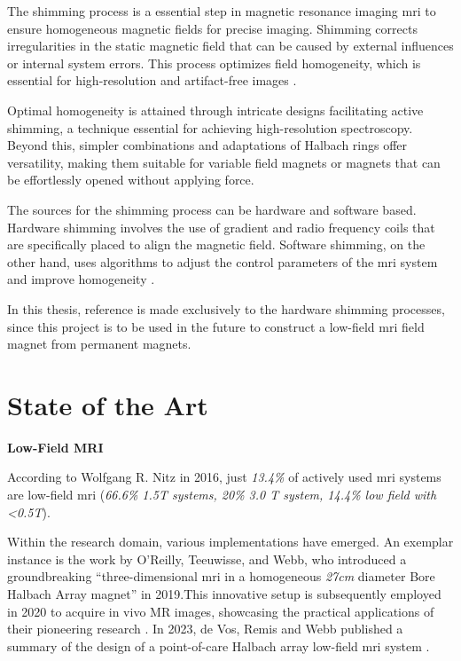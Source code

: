 The shimming process is a essential step in magnetic resonance imaging
\gls{mri} to ensure homogeneous magnetic fields for precise imaging.
Shimming corrects irregularities in the static magnetic field that can
be caused by external influences or internal system errors. This process
optimizes field homogeneity, which is essential for high-resolution and
artifact-free images \cite{10.3389/fphy.2021.704566}.

Optimal homogeneity is attained through intricate designs facilitating
active shimming, a technique essential for achieving high-resolution
spectroscopy. Beyond this, simpler combinations and adaptations of
Halbach rings offer versatility, making them suitable for variable field
magnets or magnets that can be effortlessly opened without applying
force. \cite{inbook}

The sources for the shimming process can be hardware and software based.
Hardware shimming involves the use of gradient and radio frequency coils
that are specifically placed to align the magnetic field. Software
shimming, on the other hand, uses algorithms to adjust the control
parameters of the \gls{mri} system and improve homogeneity
\cite{10.3389/fphy.2021.704566}.

In this thesis, reference is made exclusively to the hardware shimming
processes, since this project is to be used in the future to construct a
low-field \gls{mri} field magnet from permanent magnets.

\hypertarget{state-of-the-art}{%
\section{State of the Art}\label{state-of-the-art}}

\textbf{Low-Field MRI}

According to Wolfgang R. Nitz in 2016, just \emph{13.4\%} of actively
used \gls{mri} systems are low-field \gls{mri} (\emph{66.6\% 1.5T
systems, 20\% 3.0 T system, 14.4\% low field with \textless0.5T}).
\cite{Nitz2016}

Within the research domain, various implementations have emerged. An
exemplar instance is the work by O'Reilly, Teeuwisse, and Webb, who
introduced a groundbreaking ``three-dimensional \gls{mri} in a
homogeneous \emph{27cm} diameter Bore Halbach Array magnet''
\cite{OReilly2019-rn} in 2019.This innovative setup is subsequently
employed in 2020 to acquire in vivo MR images, showcasing the practical
applications of their pioneering research \cite{OReilly2021-ep}. In
2023, de Vos, Remis and Webb published a summary of the design of a
point-of-care Halbach array low-field \gls{mri} system
\cite{De_Vos2023-pb}.

